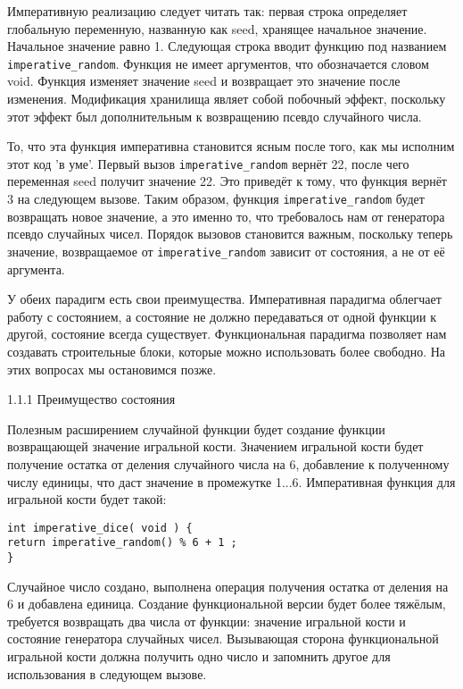Императивную реализацию следует читать так: первая строка определяет глобальную переменную, названную как seed, хранящее начальное значение. Начальное значение равно 1. Следующая строка вводит функцию под названием \lstinline|imperative_random|. Функция не имеет аргументов, что обозначается словом void. Функция изменяет значение seed и возвращает это значение после изменения. Модификация хранилища являет собой побочный эффект, поскольку этот эффект был дополнительным к возвращению псевдо случайного числа.

То, что эта функция императивна становится ясным после того, как мы исполним этот код 'в уме'. Первый вызов \lstinline|imperative_random| вернёт 22, после чего переменная seed получит значение 22. Это приведёт к тому, что функция вернёт 3 на следующем вызове. Таким образом, функция \lstinline|imperative_random| будет возвращать новое значение, а это именно то, что требовалось нам от генератора псевдо случайных чисел. Порядок вызовов становится важным, поскольку теперь значение, возвращаемое от \lstinline|imperative_random| зависит от состояния, а не от её аргумента.

У обеих парадигм есть свои преимущества. Императивная парадигма облегчает работу с состоянием, а состояние не должно передаваться от одной функции к другой, состояние всегда существует. Функциональная парадигма позволяет нам создавать строительные блоки, которые можно использовать более свободно. На этих вопросах мы остановимся позже.

1.1.1 Преимущество состояния

Полезным расширением случайной функции будет создание функции возвращающей значение игральной кости. Значением игральной кости будет получение остатка от деления случайного числа на 6, добавление к полученному числу единицы, что даст значение в промежутке 1...6. Императивная функция для игральной кости будет такой:

\begin{lstlisting}
int imperative_dice( void ) {
return imperative_random() % 6 + 1 ;
}
\end{lstlisting}

Случайное число создано, выполнена операция получения остатка от деления на 6 и добавлена единица. Создание функциональной версии будет более тяжёлым, требуется возвращать два числа от функции: значение игральной кости и состояние генератора случайных чисел. Вызывающая сторона функциональной игральной кости должна получить одно число и запомнить другое для использования в следующем вызове.

